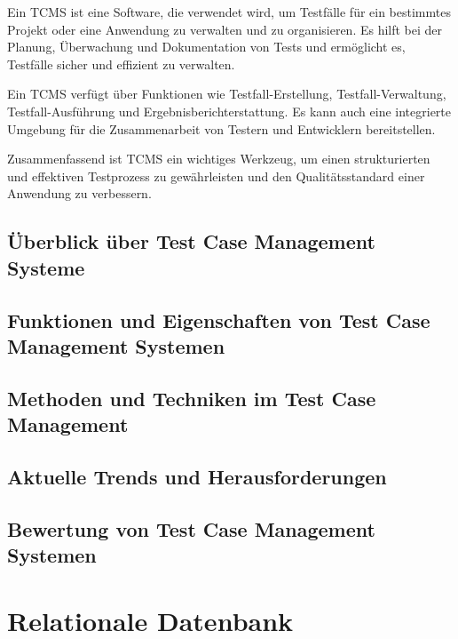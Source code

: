 \documentclass[a4paper, fontsize=11pt, parskip=half, twoside]{scrreprt}
\begin{document}
	Ein \ac{TCMS} ist eine Software, die verwendet wird, um Testfälle für ein bestimmtes Projekt oder eine Anwendung zu verwalten und zu organisieren. 
	Es hilft bei der Planung, Überwachung und Dokumentation von Tests und ermöglicht es, Testfälle sicher und effizient zu verwalten.
	
	Ein \ac{TCMS} verfügt über Funktionen wie Testfall-Erstellung, Testfall-Verwaltung, Testfall-Ausführung und Ergebnisberichterstattung. 
	Es kann auch eine integrierte Umgebung für die Zusammenarbeit von Testern und Entwicklern bereitstellen.
	
	Zusammenfassend ist \ac{TCMS} ein wichtiges Werkzeug, um einen strukturierten und effektiven Testprozess zu gewährleisten und den Qualitätsstandard einer Anwendung zu verbessern.
	
	\subsection{Überblick über Test Case Management Systeme}
	
	\subsection{Funktionen und Eigenschaften von Test Case Management Systemen}
	
	\subsection{Methoden und Techniken im Test Case Management}
	
	\subsection{Aktuelle Trends und Herausforderungen}
	
	\subsection{Bewertung von Test Case Management Systemen}
	
	\section{Relationale Datenbank}
	
\end{document}
